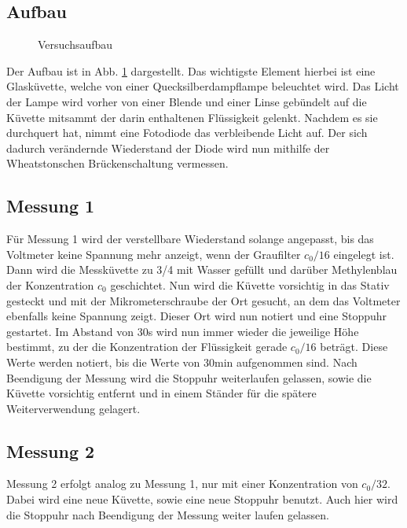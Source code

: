 \documentclass[12pt,a4paper,titlepage,headinclude,bibtotoc]{scrartcl}
\begin{document}
\subsection{Aufbau}
\begin{figure}
 \centering
 \def\svgwidth{0.8\columnwidth}
 
 \caption{Versuchsaufbau\label{fig:aufbau}}
\end{figure}
Der Aufbau ist in Abb. \ref{fig:aufbau} dargestellt.
Das wichtigste Element hierbei ist eine Glasküvette, welche von einer Quecksilberdampflampe beleuchtet wird.
Das Licht der Lampe wird vorher von einer Blende und einer Linse gebündelt auf die Küvette mitsammt der darin enthaltenen Flüssigkeit gelenkt.
Nachdem es sie durchquert hat, nimmt eine Fotodiode das verbleibende Licht auf.
Der sich dadurch verändernde Wiederstand der Diode wird nun mithilfe der Wheatstonschen Brückenschaltung vermessen.\\

\subsection{Messung 1}
\label{sec:messung1}
Für Messung 1 wird der verstellbare Wiederstand solange angepasst, bis das Voltmeter keine Spannung mehr anzeigt, wenn der Graufilter $c_0/16$ eingelegt ist.
Dann wird die Messküvette zu 3/4 mit Wasser gefüllt und darüber Methylenblau der Konzentration $c_0$ geschichtet.
Nun wird die Küvette vorsichtig in das Stativ gesteckt und mit der Mikrometerschraube der Ort gesucht, an dem das Voltmeter ebenfalls keine Spannung zeigt.
Dieser Ort wird nun notiert und eine Stoppuhr gestartet.
Im Abstand von 30s wird nun immer wieder die jeweilige Höhe bestimmt, zu der die Konzentration der Flüssigkeit gerade $c_0/16$ beträgt.
Diese Werte werden notiert, bis die Werte von 30min aufgenommen sind.
Nach Beendigung der Messung wird die Stoppuhr weiterlaufen gelassen, sowie die Küvette vorsichtig entfernt und in einem Ständer für die spätere Weiterverwendung gelagert.

\subsection{Messung 2}
Messung 2 erfolgt analog zu Messung 1, nur mit einer Konzentration von $c_0/32$.
Dabei wird eine neue Küvette, sowie eine neue Stoppuhr benutzt.
Auch hier wird die Stoppuhr nach Beendigung der Messung weiter laufen gelassen.
\end{document}
